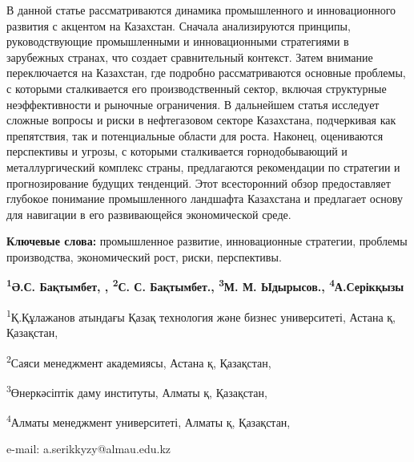 В данной статье рассматриваются динамика промышленного и инновационного
развития с акцентом на Казахстан. Сначала анализируются принципы,
руководствующие промышленными и инновационными стратегиями в зарубежных
странах, что создает сравнительный контекст. Затем внимание
переключается на Казахстан, где подробно рассматриваются основные
проблемы, с которыми сталкивается его производственный сектор, включая
структурные неэффективности и рыночные ограничения. В дальнейшем статья
исследует сложные вопросы и риски в нефтегазовом секторе Казахстана,
подчеркивая как препятствия, так и потенциальные области для роста.
Наконец, оцениваются перспективы и угрозы, с которыми сталкивается
горнодобывающий и металлургический комплекс страны, предлагаются
рекомендации по стратегии и прогнозирование будущих тенденций. Этот
всесторонний обзор предоставляет глубокое понимание промышленного
ландшафта Казахстана и предлагает основу для навигации в его
развивающейся экономической среде.

{\bfseries Ключевые слова:} промышленное развитие, инновационные стратегии,
проблемы производства, экономический рост, риски, перспективы.


\begin{center}
{\bfseries \textsuperscript{1}Ә.С. Бақтымбет, , \textsuperscript{2}С. С.
Бақтымбет., \textsuperscript{3}М. М. Ыдырысов.,
\textsuperscript{4}А.Серікқызы\envelope}

\textsuperscript{1}Қ.Құлажанов атындағы Қазақ технология және бизнес
университеті, Астана қ, Қазақстан,

\textsuperscript{2}Саяси менеджмент академиясы, Астана қ, Қазақстан,

\textsuperscript{3}Өнеркәсіптік даму институты, Алматы қ, Қазақстан,

\textsuperscript{4}Алматы менеджмент университеті, Алматы қ, Қазақстан,

e-mail: a.serikkyzy@almau.edu.kz
\end{center}

